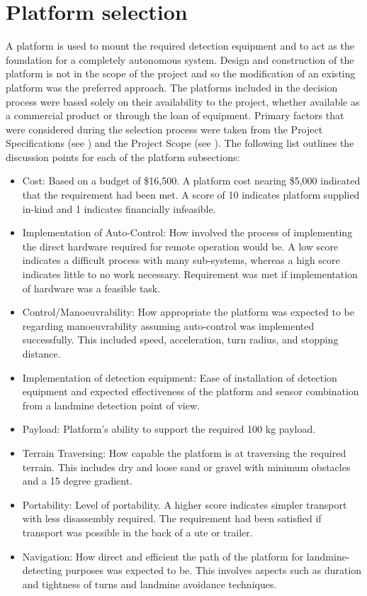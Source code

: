 \documentclass[main.tex]{subfiles}
\begin{document}
\section{Platform selection}
A platform is used to mount the required detection equipment and to act as the foundation for a completely autonomous system.  Design and construction of the platform is not in the scope of the project and so the modification of an existing platform was the preferred approach. The platforms included in the decision process were based solely on their availability to the project, whether available as a commercial product or through the loan of equipment. Primary factors that were considered during the selection process were taken from the Project Specifications (see ) and the Project Scope (see ). The following list outlines the discussion points for each of the platform subsections:
\begin{itemize}
\item Cost: Based on a budget of \$16,500. A platform cost nearing \$5,000 indicated that the requirement had been met. A score of 10 indicates platform supplied in-kind and 1 indicates financially infeasible.
\item Implementation of Auto-Control: How involved the process of implementing the direct hardware required for remote operation would be. A low score indicates a difficult process with many sub-systems, whereas a high score indicates little to no work necessary. Requirement was met if implementation of hardware was a feasible task.
\item Control/Manoeuvrability: How appropriate the platform was expected to be regarding manoeuvrability assuming auto-control was implemented successfully. This included speed, acceleration, turn radius, and stopping distance.
\item Implementation of detection equipment: Ease of installation of detection equipment and expected effectiveness of the platform and sensor combination from a landmine detection point of view.
\item Payload: Platform's ability to support the required 100 kg payload.
\item Terrain Traversing: How capable the platform is at traversing the required terrain. This includes dry and loose sand or gravel with minimum obstacles and a 15 degree gradient.
\item Portability: Level of portability. A higher score indicates simpler transport with less disassembly required. The requirement had been satisfied if transport was possible in the back of a ute or trailer.
\item Navigation: How direct and efficient the path of the platform for landmine-detecting purposes was expected to be. This involves aspects such as duration and tightness of turns and landmine avoidance techniques.
\end{itemize}
\end{document}

